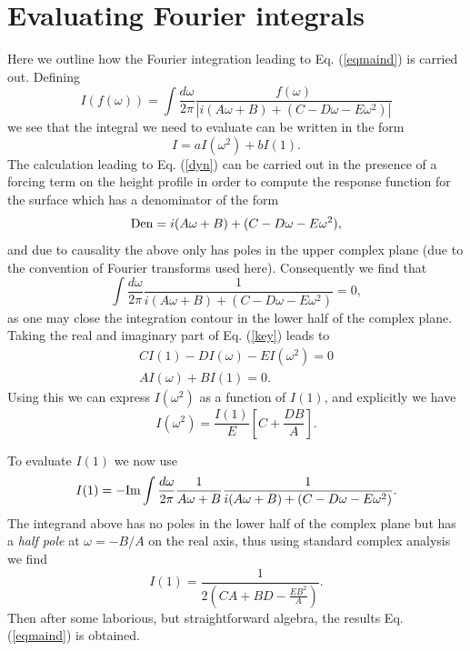 \section{Evaluating Fourier integrals}
Here we outline how the Fourier integration leading to Eq. (\ref{eqmaind}) is carried out. Defining
\begin{equation}
I(f(\omega)) = \int \frac{d\omega}{2\pi} \frac{f(\omega)}{\left|i(A\omega + B) + (C-D\omega-E \omega^2)\right|}
\end{equation}
we see that the integral we need to evaluate can be written in the form
\begin{equation}
I = a I(\omega^2) + b I(1).
\end{equation}
The calculation leading to Eq. (\ref{dyn}) can be carried out in the presence of a forcing term on the height profile in order to compute the response function for the surface which has a denominator of the form
\begin{equation}
{\rm Den} = i(A\omega + B) + (C-D\omega-E \omega^2),
\end{equation}
and due to causality the above only has poles in the upper complex plane (due to the convention of Fourier transforms used here). Consequently we find that
\begin{equation}
\int \frac{d\omega}{2\pi} \frac{1}{i(A\omega + B) + (C-D\omega-E \omega^2)} = 0,\label{key}
\end{equation}
as one may close the integration contour in the lower half of the complex plane. Taking the real and imaginary part of Eq. (\ref{key}) leads to
\begin{eqnarray}
C I(1) -D I(\omega) - E I(\omega^2) = 0 \\
AI(\omega) + B I(1) = 0.
\end{eqnarray}
Using this we can express $I(\omega^2)$ as a function of $I(1)$, and explicitly we have 
\begin{equation}
I(\omega^2) = \frac{I(1)}{E}[C+ \frac{DB}{A}].
\end{equation}

To evaluate $I(1)$ we now use
\begin{equation}
I(1) = -{\rm Im} \int \frac{d\omega}{2\pi}\frac{1}{A\omega +B} \frac{1}{i(A\omega + B) + (C-D\omega-E \omega^2)}.
\end{equation}
The integrand above has no poles in the lower half of the complex plane but has a {\em half pole} at $\omega=-B/A$ on the real axis, thus using standard complex analysis we find
\begin{equation}
I(1) = \frac{1}{2(CA + BD - \frac{EB^2}{A})}.
\end{equation}
Then after some laborious, but straightforward algebra, the results Eq. (\ref{eqmaind}) is obtained.





